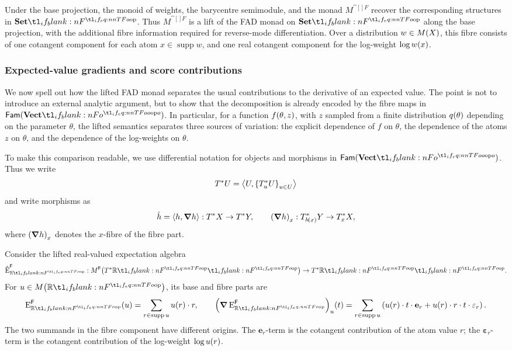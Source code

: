 \documentclass[11pt,a4paper]{article}
\theoremstyle{definition}
\theoremstyle{remark}
\providecommand{\Fam}[1]{\mathsf{Fam}(#1)}
\providecommand{\supp}{\operatorname{supp}}
\providecommand{\vect}[1]{\mathbf{#1}}
\begin{document}
Under the base projection, the monoid of weights, the barycentre semimodule,
and the monad \(M^{\cat[]{F}}\) recover the corresponding structures in
\( \Set \). Thus \(M^{\cat[]{F}}\) is a lift of the FAD monad on \( \Set \)
along the base projection, with the additional fibre information required for
reverse-mode differentiation. Over a distribution \(w\in\Fun[nn]{M}{X}\), this
fibre consists of one cotangent component for each atom \(x\in\supp w\), and
one real cotangent component for the log-weight \(\log\fn[n]{w}{x}\).

\subsubsection{Expected-value gradients and score contributions}

We now spell out how the lifted FAD monad separates the usual contributions to
the derivative of an expected value. The point is not to introduce an external
analytic argument, but to show that the decomposition is already encoded by
the fibre maps in \( \Fam{\Vect[o]} \). In particular, for a function
\( \fn[n]{f}{\theta,z} \), with \(z\) sampled from a finite distribution
\( \fn[n]{q}{\theta} \) depending on the parameter \( \theta \), the lifted
semantics separates three sources of variation: the explicit dependence of
\(f\) on \( \theta \), the dependence of the atoms \(z\) on \( \theta \), and
the dependence of the log-weights on \( \theta \).

To make this comparison readable, we use differential notation for objects and
morphisms in \( \Fam{\Vect[o]} \). Thus we write
\[
T^{\ast}U
=
\left\langle 
	U,
	\left\{T^{\ast}_{u}U\right\}_{u\in U}
\right\rangle
\]
and write morphisms as
\begin{equation*}
	\hat{h} = \tuple{ h, \grad h }: T^{\ast} X \to T^{\ast} Y,
	\qquad
	\left( \grad h \right)_{x} :
	T^{\ast}_{\fn[n]{h}{x}}Y \to T^{\ast}_{x}X,
\end{equation*}
where \( \Nat[pn]{ \grad h }{x} \) denotes the \(x\)-fibre of the fibre part.

Consider the lifted real-valued expectation algebra
\[
\hat{\opn{E}}_{\R}^{\cat[]{F}}:
\Fun[np]{M^{\cat[]{F}}}{\TR}
\to
\TR .
\]
For \(u\in\Fun[nn]{M}{\R}\), its base and fibre parts are
\begin{equation}
	\label{eq:lifted-real-expectation-fibre}
	\fn[n]{ \opn{E}_{\R}^{\cat[]{F}} }{u}
	=
	\sum_{r\in\supp u} \fn[n]{ u }{ r } \cdot r,
	\qquad
	\fn[n]{ \Nat[pn]{ \grad \opn{E}_{\R}^{\cat[]{F}} }{ u } }{ t }
	=
	\sum_{r \in \supp u}
	\left(
	\fn[n]{ u }{ r } \cdot t \cdot\vect{e}_{r}
	+
	\fn[n]{ u }{ r } \cdot r \cdot t \cdot \vect{\varepsilon}_{r}
	\right).
\end{equation}
The two summands in the fibre component have different origins. The
\( \vect{e}_{r} \)-term is the cotangent contribution of the atom value \(r\);
the \( \vect{\varepsilon}_{r} \)-term is the cotangent contribution of the
log-weight \( \log \fn[n]{u}{r} \).
\end{document}
